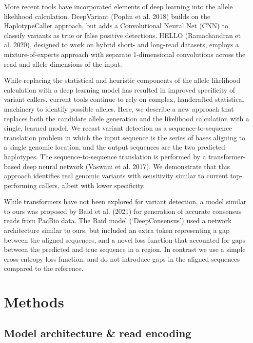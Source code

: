 \documentclass[]{article}
\begin{document}
More recent tools have incorporated elements of deep learning into the allele likelihood calculation. DeepVariant (Poplin et al. 2018) builds on the HaplotypeCaller approach, but adds a Convolutional Neural Net (CNN) to classify variants as true or false positive detections. HELLO (Ramachandran et al. 2020), designed to work on hybrid short- and long-read datasets, employs a mixture-of-experts approach with separate 1-dimensional convolutions across the read and allele dimensions of the input. 

While replacing the statistical and heuristic components of the allele likelihood calculation with a deep learning model has resulted in improved specificity of variant callers, current tools continue to rely on complex, handcrafted statistical machinery to identify possible alleles. Here, we describe a new approach that replaces both the candidate allele generation and the likelihood calculation with a single, learned model. We recast variant detection as a sequence-to-sequence translation problem in which the input sequence is the series of bases aligning to a single genomic location, and the output sequences are the two predicted haplotypes. The sequence-to-sequence translation is performed by a transformer-based deep neural network (Vaswani et al. 2017). We demonstrate that this approach identifies real genomic variants with sensitivity similar to current top-performing callers, albeit with lower specificity. 

While transformers have not been explored for variant detection, a model similar to ours was proposed by Baid et al. (2021) for generation of accurate consensus reads from PacBio data. The Baid model (`DeepConsensus') used a network architecture similar to ours, but included an extra token representing a gap between the aligned sequences, and a novel loss function that accounted for gaps between the predicted and true sequence in a region. In contrast we use a simple cross-entropy loss function, and do not introduce gaps in the aligned sequences compared to the reference. 

\section{Methods}

\subsection{Model architecture \& read encoding}
\end{document}
